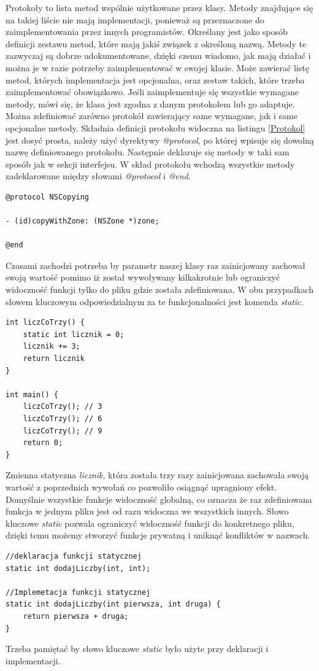 \documentclass{iiuwb}
\begin{document}
Protokoły \cite{Kohan:2012:Obj} to lista metod wspólnie użytkowane przez klasy. Metody znajdujące się na takiej liście nie mają implementacji, ponieważ są przeznaczone do zaimplementowania przez innych programistów. Określany jest jako sposób definicji zestawu metod, które mają jakiś związek z określoną nazwą. Metody te zazwyczaj są dobrze udokumentowane, dzięki czemu wiadomo, jak mają działać i można je w razie potrzeby zaimplementować w swojej klasie. Może zawierać listę metod, których implementacja jest opcjonalna, oraz zestaw takich, które trzeba zaimplementować obowiązkowo. Jeśli zaimplementuje się wszystkie wymagane metody, mówi się, że klasa jest zgodna z danym protokołem lub go adaptuje. Można zdefiniować zarówno protokół zawierający same wymagane, jak i same opcjonalne metody. Składnia definicji protokołu widoczna na listingu \ref{Protokol} jest dosyć prosta, należy użyć dyrektywy \textit{@protocol}, po której wpisuje się dowolną nazwę definiowanego protokołu. Następnie deklaruje się metody w taki sam sposób jak w sekcji interfejsu. W skład protokołu wchodzą wszystkie metody zadeklarowane między słowami \textit{@protocol} i \textit{@end}.

\begin{lstlisting}[label=Protokol, caption=Protokół \textit{NSCopying} zdefiniowany w pliku nagłówkowym \textit{NSObject.h}]
@protocol NSCopying

- (id)copyWithZone: (NSZone *)zone;

@end
\end{lstlisting}

Czasami zachodzi potrzeba by parametr naszej klasy raz zainicjowany zachował swoją wartość pomimo iż został wywoływany kilkakrotnie lub ograniczyć widoczność funkcji tylko do pliku gdzie została zdefiniowana. W obu przypadkach słowem kluczowym odpowiedzialnym za te funkcjonalności jest komenda \textit{static}.
\begin{lstlisting}
int liczCoTrzy() {
	static int licznik = 0;
	licznik += 3;
	return licznik
}

int main() {
	liczCoTrzy(); // 3
	liczCoTrzy(); // 6
	liczCoTrzy(); // 9
	return 0;
}
\end{lstlisting}
Zmienna statyczna \textit{licznik}, która została trzy razy zainicjowana zachowała swoją wartość z poprzednich wywołań co pozwoliło osiągnąć upragniony efekt.
Domyślnie wszystkie funkcje widoczność globalną, co oznacza że raz zdefiniowana funkcja w jednym pliku jest od razu widoczna we wszystkich innych. Słowo kluczowe \textit{static} pozwala ograniczyć widoczność funkcji do konkretnego pliku, dzięki temu możemy stworzyć funkcje prywatną i uniknąć konfliktów w nazwach.
\begin{lstlisting}
//deklaracja funkcji statycznej
static int dodajLiczby(int, int);

//Implemetacja funkcji statycznej
static int dodajLiczby(int pierwsza, int druga) {
	return pierwsza + druga;
}
\end{lstlisting}
Trzeba pamiętać by słowo kluczowe \textit{static} było użyte przy deklaracji i implementacji.
\end{document}
